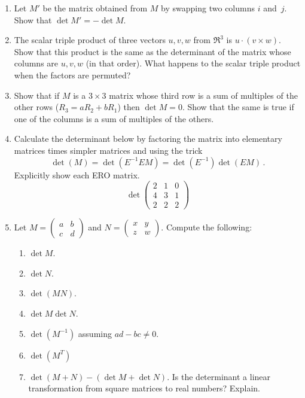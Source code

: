 \begin{enumerate}
\item Let $M'$ be the matrix obtained from $M$ by swapping two columns $i$ and~$j$. Show that $\det M'=-\det M $.

\item The scalar triple product of three vectors $u,v,w$ from $\Re^3$ is $u\cdot(v\times w)$. Show that this product is the same as the determinant of the matrix whose columns are $u,v,w$ (in that order). What happens to the scalar triple product when the factors are permuted? 

\item Show that if $M$ is a $3\times 3$ matrix whose third row is a sum of multiples of the other rows ($R_3=aR_2+bR_1$) then $\det M=0$. Show that the same is true if one of the columns is a sum of multiples of the others. 




\item Calculate the determinant below by factoring the matrix into 
elementary matrices times simpler matrices and using the trick
$$\det (M)= \det ( E^{-1}EM)=
\det (E^{-1})  \det (EM)\, .$$ Explicitly show each ERO matrix.
$$
\det
\begin{pmatrix}
2 & 1 &0\\
4 & 3&1\\
2&2&2
\end{pmatrix}
$$


\item Let $M=\begin{pmatrix}
a & b \\
c & d
\end{pmatrix}$ and $N=\begin{pmatrix}
x & y \\
z & w
\end{pmatrix}$.  Compute the following:
\begin{enumerate}
\item $\det M$.
\item $\det N$.
\item $\det (MN)$.
\item $\det M \det N$.
\item $\det (M^{-1})$ assuming $ad-bc\neq 0$.
\item $\det (M^T)$
\item $\det (M+N) - (\det M + \det N)$. Is the determinant a linear transformation from square matrices to real numbers? Explain.
\end{enumerate}


\end{enumerate}
